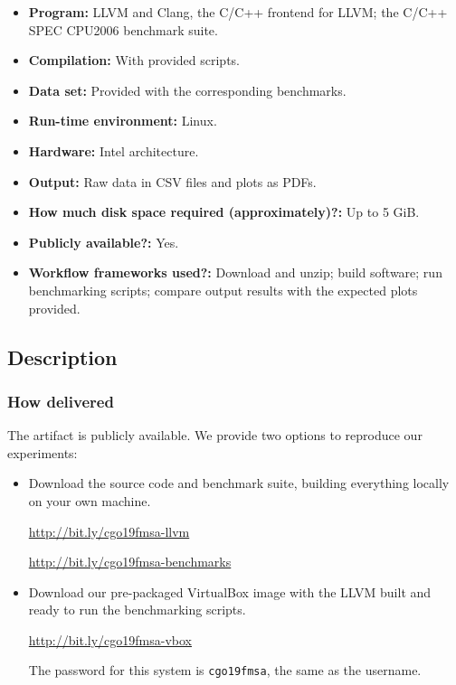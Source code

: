 {\small
\begin{itemize}
  \item {\bf Program: } LLVM and Clang, the C/C++ frontend for LLVM; the C/C++ SPEC CPU2006 benchmark suite.
  \item {\bf Compilation: } With provided scripts.
  \item {\bf Data set: } Provided with the corresponding benchmarks.
  \item {\bf Run-time environment: } Linux.
  \item {\bf Hardware: } Intel architecture.
  \item {\bf Output: } Raw data in CSV files and plots as PDFs.
  \item {\bf How much disk space required (approximately)?: } Up to 5 GiB.
  \item {\bf Publicly available?: } Yes.
  \item {\bf Workflow frameworks used?: } Download and unzip; build software; run benchmarking scripts; compare output results with the expected plots provided.
\end{itemize}

\subsection{Description}

\subsubsection{How delivered}

The artifact is publicly available.
We provide two options to reproduce our experiments:

\begin{itemize}
  \item Download the source code and benchmark suite, building everything locally on your own machine.

\url{http://bit.ly/cgo19fmsa-llvm}

\url{http://bit.ly/cgo19fmsa-benchmarks}

  \item Download our pre-packaged VirtualBox image with the LLVM built and ready
to run the benchmarking scripts.

\url{http://bit.ly/cgo19fmsa-vbox}

The password for this system is \texttt{cgo19fmsa}, the same as the username.


\end{itemize}}
